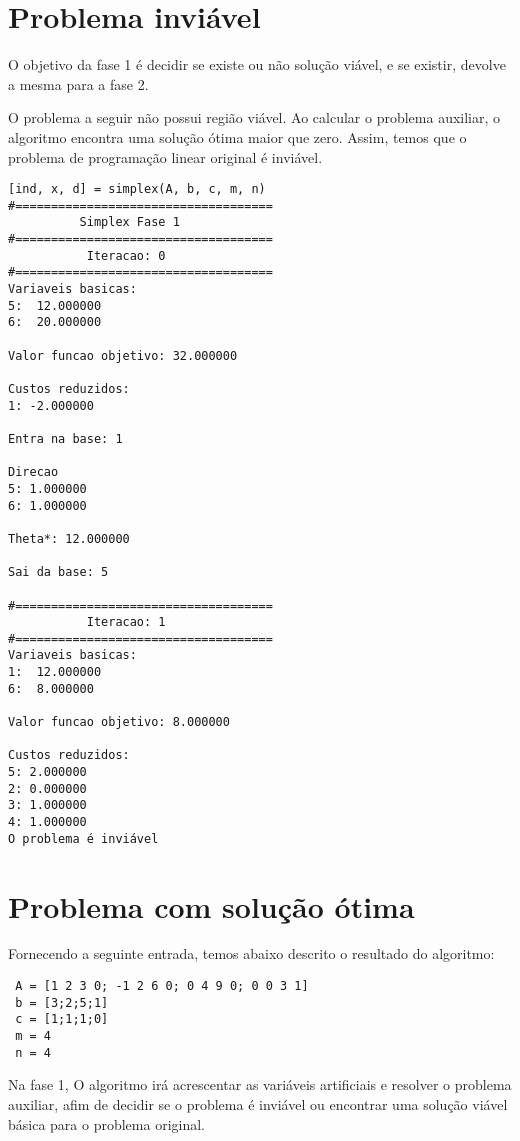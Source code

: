 \documentclass[
	12pt,				%
	openright,			%
	oneside,			%
	a4paper,			%
	english,			%
	french,				%
	spanish,			%
	brazil,				%
	]{abntex2}
\begin{document}
\section{Problema inviável}
O objetivo da fase 1 é decidir se existe ou não solução viável, e se existir, devolve a mesma para a fase 2.

O problema a seguir não possui região viável. Ao calcular o problema auxiliar, o algoritmo encontra uma solução ótima maior que zero. Assim, temos que o problema de programação linear original é inviável.

\begin{verbatim}
[ind, x, d] = simplex(A, b, c, m, n)
#====================================
          Simplex Fase 1
#====================================
           Iteracao: 0
#====================================
Variaveis basicas:
5:  12.000000
6:  20.000000

Valor funcao objetivo: 32.000000

Custos reduzidos:
1: -2.000000

Entra na base: 1

Direcao
5: 1.000000
6: 1.000000

Theta*: 12.000000

Sai da base: 5

#====================================
           Iteracao: 1
#====================================
Variaveis basicas:
1:  12.000000
6:  8.000000

Valor funcao objetivo: 8.000000

Custos reduzidos:
5: 2.000000
2: 0.000000
3: 1.000000
4: 1.000000
O problema é inviável 
\end{verbatim}


\section{Problema com solução ótima}
Fornecendo a seguinte entrada, temos abaixo descrito o resultado do algoritmo:

\begin{verbatim}
 A = [1 2 3 0; -1 2 6 0; 0 4 9 0; 0 0 3 1]
 b = [3;2;5;1]
 c = [1;1;1;0]
 m = 4
 n = 4
\end{verbatim}

Na fase 1, O algoritmo irá acrescentar as variáveis artificiais e resolver o problema auxiliar, afim de decidir se o problema é inviável ou encontrar uma solução viável básica para o problema original.
\end{document}
